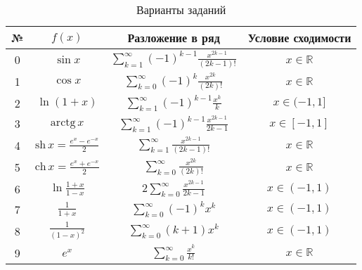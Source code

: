 \begin{table}
  \begin{centering}
    \begin{tabular}{|c|c|c|c|}
      \hline № & $f(x)$ & Разложение в ряд & Условие сходимости\\
      \hline
      \hline
      0\vphantom{$\Biggl(\Biggr)$} & $\sin x$ & $\sum_{k=1}^{\infty}(-1)^{k-1}\frac{x^{2k-1}}{(2k-1)!}$ &
      $x\in\mathbb{R}$ \\
      \hline
      1\vphantom{$\Biggl(\Biggr)$} &
      $\cos x$ & $\sum_{k=0}^{\infty}(-1)^{k}\frac{x^{2k}}{(2k)!}$ &
      $x\in\mathbb{R}$\tabularnewline \hline 2\vphantom{$\Biggl(\Biggr)$} &
      $\ln(1+x)$ & $\sum_{k=1}^{\infty}(-1)^{k-1}\frac{x^{k}}{k}$ &
      $x\in(-1,1]$\tabularnewline \hline 3\vphantom{$\Biggl(\Biggr)$} &
        $\mathrm{arctg}\, x$ &
        $\sum_{k=1}^{\infty}(-1)^{k-1}\frac{x^{2k-1}}{2k-1}$ &
        $x\in[-1,1]$\tabularnewline \hline 4\vphantom{$\Biggl(\Biggr)$} &
        $\mathrm{sh}\, x=\frac{e^{x}-e^{-x}}{2}$ &
        $\sum_{k=1}^{\infty}\frac{x^{2k-1}}{(2k-1)!}$ &
        $x\in\mathbb{R}$\tabularnewline \hline 5\vphantom{$\Biggl(\Biggr)$}
        & $\mathrm{ch}\, x=\frac{e^{x}+e^{-x}}{2}$ &
        $\sum_{k=0}^{\infty}\frac{x^{2k}}{(2k)!}$ &
        $x\in\mathbb{R}$\tabularnewline \hline 6\vphantom{$\Biggl(\Biggr)$}
        & $\ln\frac{1+x}{1-x}$ & $2\sum_{k=0}^{\infty}\frac{x^{2k-1}}{2k-1}$
        & $x\in(-1,1)$\tabularnewline \hline 7\vphantom{$\Biggl(\Biggr)$} &
        $\frac{1}{1+x}$ & $\sum_{k=0}^{\infty}(-1)^{k}x^{k}$ &
        $x\in(-1,1)$\tabularnewline \hline 8\vphantom{$\Biggl(\Biggr)$} &
        $\frac{1}{(1-x)^{2}}$ & $\sum_{k=0}^{\infty}(k+1)x^{k}$ &
        $x\in(-1,1)$\tabularnewline \hline 9\vphantom{$\Biggl(\Biggr)$} &
        $e^{x}$ & $\sum_{k=0}^{\infty}\frac{x^{k}}{k!}$ &
        $x\in\mathbb{R}$\tabularnewline \hline
    \end{tabular}
    \par\end{centering}

    \caption{Варианты заданий}
\end{table}

\Questions


